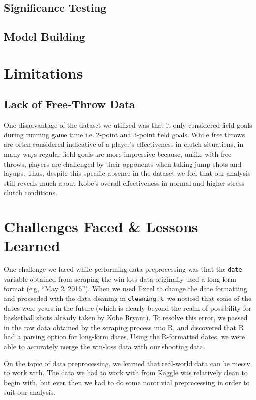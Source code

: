 \documentclass[paper=a4, fontsize=11pt]{scrartcl} %
\numberwithin{equation}{section} %
\numberwithin{figure}{section} %
\numberwithin{table}{section} %
\begin{document}
\subsection{Significance Testing}
\subsection{Model Building}

\section{Limitations}
\subsection{Lack of Free-Throw Data}
\hspace*{1cm}One disadvantage of the dataset we utilized was that it only considered field goals during running game time i.e. 2-point and 3-point field goals. While free throws are often considered indicative of a player's effectiveness in clutch situations, in many ways regular field goals are more impressive because, unlike with free throws, players are challenged by their opponents when taking jump shots and layups. Thus, despite this specific absence in the dataset we feel that our analysis still reveals much about Kobe's overall effectiveness in normal and higher stress clutch conditions.
\section{Challenges Faced \& Lessons Learned}
\hspace*{1cm}One challenge we faced while performing data preprocessing was that the \texttt{date} variable obtained from scraping the win-loss data originally used a long-form format (e.g, ``May 2, 2016''). When we used Excel to change the date formatting and proceeded with the data cleaning in \texttt{cleaning.R}, we noticed that some of the dates were years in the future (which is clearly beyond the realm of possibility for basketball shots already taken by Kobe Bryant). To resolve this error, we passed in the raw data obtained by the scraping process into R, and discovered that R had a parsing option for long-form dates. Using the R-formatted dates, we were able to accurately merge the win-loss data with our shooting data. 

\hspace*{1cm}On the topic of data preprocessing, we learned that real-world data can be messy to work with. The data we had to work with from Kaggle was relatively clean to begin with, but even then we had to do some nontrivial preprocessing in order to suit our analysis.
\end{document}
